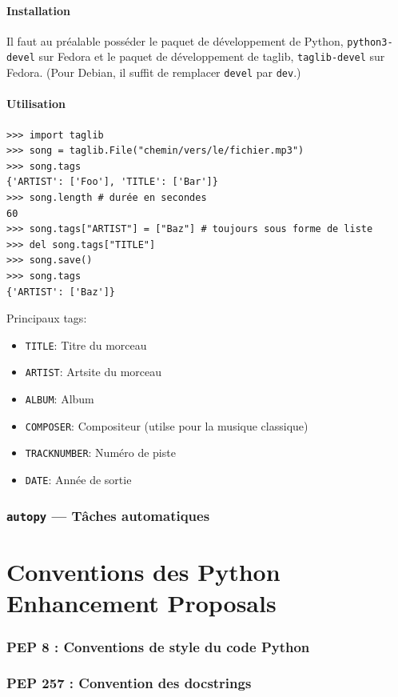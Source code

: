 \documentclass[a4paper, 10pt]{article}
\begin{document}
\subsection{Installation}
Il faut au préalable posséder le paquet de développement de Python, \texttt{python3-devel} sur Fedora et le paquet de développement de taglib, \texttt{taglib-devel} sur Fedora. (Pour Debian, il suffit de remplacer \texttt{devel} par \texttt{dev}.)

\subsection{Utilisation}
\begin{verbatim}
>>> import taglib
>>> song = taglib.File("chemin/vers/le/fichier.mp3")
>>> song.tags
{'ARTIST': ['Foo'], 'TITLE': ['Bar']}
>>> song.length # durée en secondes
60
>>> song.tags["ARTIST"] = ["Baz"] # toujours sous forme de liste
>>> del song.tags["TITLE"]
>>> song.save()
>>> song.tags
{'ARTIST': ['Baz']}
\end{verbatim}

Principaux tags:
\begin{itemize}
    \item \texttt{TITLE}: Titre du morceau
    \item \texttt{ARTIST}: Artsite du morceau
    \item \texttt{ALBUM}: Album
    \item \texttt{COMPOSER}: Compositeur (utilse pour la musique classique)
    \item \texttt{TRACKNUMBER}: Numéro de piste
    \item \texttt{DATE}: Année de sortie
\end{itemize}

\section[{\footnotesize\texttt{autopy}} --- Tâches automatiques]{{\normalfont\large\bfseries\texttt{autopy}} --- Tâches automatiques}

\part{Conventions des Python Enhancement Proposals}
\section{PEP 8 : Conventions de style du code Python}
\section{PEP 257 : Convention des docstrings}


\printindex
\end{document}
